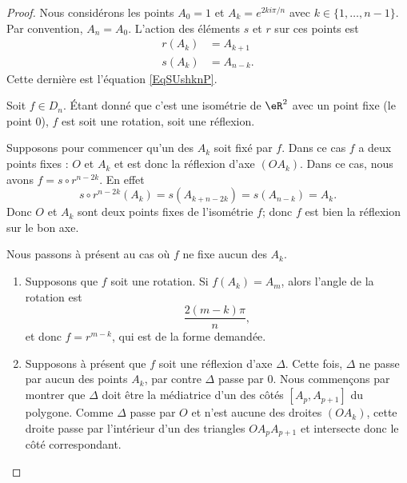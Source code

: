 \begin{proof}
	Nous considérons les points \( A_0=1\) et \( A_k= e^{2ki\pi/n}\) avec \( k\in\{ 1,\ldots, n-1 \}\). Par convention, \( A_n=A_0\). L'action des éléments \( s\) et \( r\) sur ces points est
	\begin{subequations}
		\begin{align}
			r(A_k) & =A_{k+1}  \\
			s(A_k) & =A_{n-k}.
		\end{align}
	\end{subequations}
	Cette dernière est l'équation \eqref{EqSUshknP}.

	Soit \( f\in D_n\). Étant donné que c'est une isométrie de \( \eR^2\) avec un point fixe (le point \( 0\)), \( f\) est soit une rotation, soit une réflexion.

	Supposons pour commencer qu'un des \( A_k\) soit fixé par \( f\). Dans ce cas \( f\) a deux points fixes : \( O\) et \( A_k\) et est donc la réflexion d'axe \( (OA_k)\). Dans ce cas, nous avons \( f=s\circ r^{n-2k}\). En effet
	\begin{equation}
		s\circ r^{n-2k}(A_k)=s(A_{k+n-2k})=s(A_{n-k})=A_k.
	\end{equation}
	Donc \( O\) et \( A_k\) sont deux points fixes de l'isométrie \( f\); donc \( f\) est bien la réflexion sur le bon axe.

	Nous passons à présent au cas où \( f\) ne fixe aucun des \( A_k\).
	\begin{enumerate}
		\item
		      Supposons que \( f\) soit une rotation. Si \( f(A_k)=A_m\), alors l'angle de la rotation est
		      \begin{equation}
			      \frac{ 2(m-k)\pi }{ n },
		      \end{equation}
		      et donc \( f=r^{m-k}\), qui est de la forme demandée.
		\item
		      Supposons à présent que \( f\) soit une réflexion d'axe \( \Delta\). Cette fois, \( \Delta\) ne passe par aucun des points \( A_k\), par contre \( \Delta\) passe par \( 0\). Nous commençons par montrer que \( \Delta\) doit être la médiatrice d'un des côtés \( [A_p,A_{p+1}]\) du polygone. Comme \( \Delta\) passe par \( O\) et n'est aucune des droites \( (OA_k)\), cette droite passe par l'intérieur d'un des triangles \( OA_pA_{p+1}\) et intersecte donc le côté correspondant.


\end{enumerate}
\end{proof}
